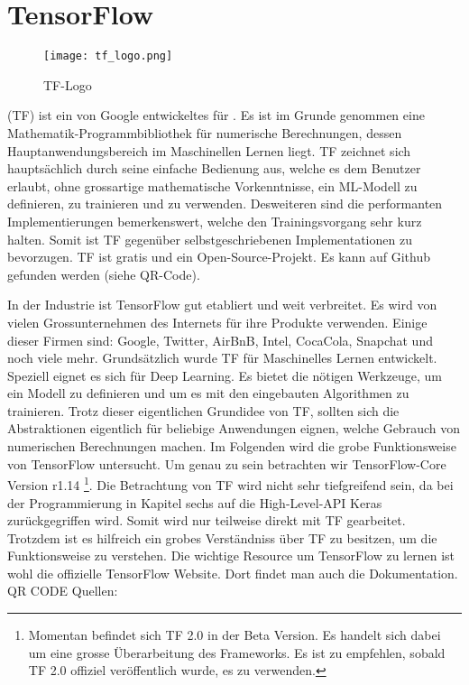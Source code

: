 \section{TensorFlow}\label{sec:tensorflow}
\begin{wrapfigure}{L}{2.5cm}
  \texttt{[image: tf\_logo.png]}
  \caption{TF-Logo}
\end{wrapfigure}
 (TF) ist ein von Google entwickeltes  für
. Es ist im Grunde genommen eine
Mathematik-Programmbibliothek für numerische Berechnungen, dessen Hauptanwendungsbereich im Maschinellen Lernen
liegt. TF zeichnet sich hauptsächlich durch seine einfache Bedienung aus, welche
es dem Benutzer erlaubt, ohne grossartige mathematische Vorkenntnisse, ein ML-Modell zu definieren,
zu trainieren und zu verwenden. Desweiteren sind die performanten
Implementierungen bemerkenswert, welche den Trainingsvorgang sehr kurz halten.
Somit ist TF gegenüber selbstgeschriebenen Implementationen zu bevorzugen.
TF ist gratis und ein Open-Source-Projekt. Es kann auf Github gefunden werden
(siehe QR-Code).
\begin{wrapfigure}{L}{2cm}
\end{wrapfigure}
In der Industrie ist TensorFlow gut etabliert und weit verbreitet. Es wird von
vielen Grossunternehmen des Internets für ihre Produkte verwenden. Einige dieser
Firmen sind: Google, Twitter, AirBnB, Intel, CocaCola, Snapchat und noch viele mehr.
\para{}
Grundsätzlich wurde TF für Maschinelles Lernen entwickelt. Speziell eignet es
sich für Deep Learning. Es bietet die nötigen Werkzeuge, um ein Modell zu
definieren und um es mit den eingebauten Algorithmen zu trainieren.
Trotz dieser eigentlichen Grundidee von TF, sollten sich die Abstraktionen eigentlich
für beliebige Anwendungen eignen, welche Gebrauch von numerischen Berechnungen machen.
\para{}
Im Folgenden wird die grobe Funktionsweise von TensorFlow untersucht. Um
genau zu sein betrachten wir TensorFlow-Core Version r1.14%
\footnote{Momentan befindet sich TF 2.0 in der Beta Version. Es handelt sich
  dabei um eine grosse Überarbeitung des Frameworks. Es ist zu empfehlen, sobald TF 2.0 offiziel
  veröffentlich wurde, es zu verwenden.}.
Die Betrachtung von TF wird nicht sehr tiefgreifend sein, da bei der
Programmierung in Kapitel sechs auf die High-Level-API Keras zurückgegriffen
wird. Somit wird nur teilweise direkt mit TF gearbeitet. Trotzdem ist es hilfreich ein
grobes Verständniss über TF zu besitzen, um die Funktionsweise zu verstehen.
\para{}
Die wichtige Resource um TensorFlow zu lernen ist wohl die offizielle TensorFlow
Website. Dort findet man auch die Dokumentation. QR CODE
\para{}
Quellen: \cite{book:tensorflow} \cite{net:tf_docs}

